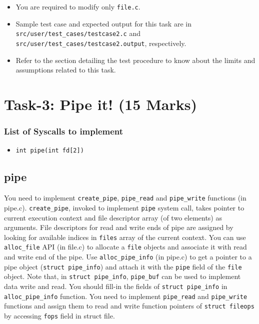 \documentclass[12pt]{article}
\begin{document}
\begin{itemize}
    \item You are required to modify only {\tt file.c}.
    \item Sample test case and expected output for this task are in {\tt src/user/test\_cases/testcase2.c}
        and {\tt src/user/test\_cases/testcase2.output}, respectively.
    \item Refer to the section detailing the test procedure to know about the limits and assumptions related to
          this task.
\end{itemize}

\section{Task-3: Pipe it! (15 Marks)}

\subsubsection*{List of Syscalls to implement}
\begin{itemize}
    \item {\tt int pipe(int fd[2])}
\end{itemize}

\subsection{pipe}

You need to implement {\tt create\_pipe}, {\tt pipe\_read} and {\tt pipe\_write}
functions (in pipe.c). {\tt create\_pipe}, invoked to implement {\tt pipe} system call, 
takes pointer to current execution context and file descriptor array (of two elements) as arguments. 
File descriptors for read and write ends of pipe are assigned by looking for available indices 
in {\tt files} array of the current context.  You can use {\tt alloc\_file} API (in file.c) 
to allocate a {\tt file} objects and associate it with read and write end of the pipe. 
Use {\tt alloc\_pipe\_info} (in pipe.c) to get a pointer to a pipe object ({\tt struct pipe\_info}) 
and attach it with the {\tt pipe} field of the {\tt file} object. Note that, in {\tt struct pipe\_info},
{\tt pipe\_buf} can be used to implement data write and read.
%
You should fill-in the fields of {\tt struct pipe\_info} in {\tt alloc\_pipe\_info} function. You need to implement 
{\tt pipe\_read} and {\tt pipe\_write} functions and assign them to read and write function 
pointers of {\tt struct fileops} by accessing {\tt fops} field in struct file.
     
\end{document}

